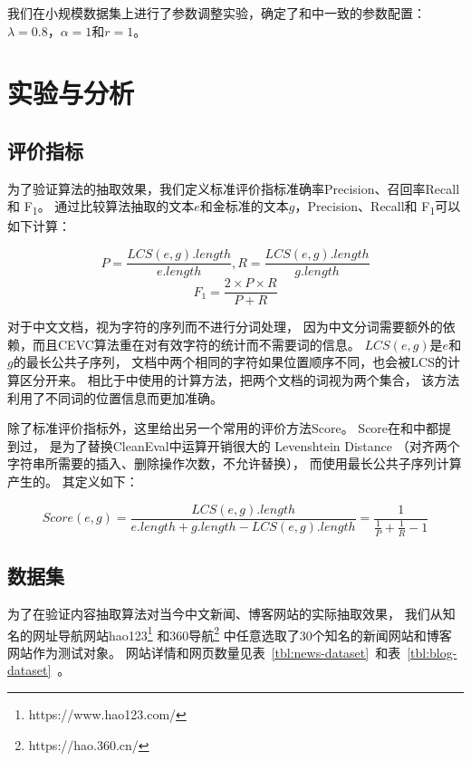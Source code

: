 我们在小规模数据集上进行了参数调整实验，确定了和\cite{wu2013web}中一致的参数配置：
$\lambda=0.8$，$\alpha=1$和$r=1$。

\section{实验与分析}
\label{sec:cevc-experiment}

\subsection{评价指标}
为了验证算法的抽取效果，我们定义标准评价指标准确率Precision、召回率Recall和
F\textsubscript{1}。
通过比较算法抽取的文本$e$和金标准的文本$g$，Precision、Recall和
F\textsubscript{1}可以如下计算：

\begin{equation}
P = \frac{LCS(e,g).length}{e.length}, R = \frac{LCS(e,g).length}{g.length}
\end{equation}
\begin{equation}
F_1 = \frac{2 \times P \times R}{P + R}
\end{equation}

对于中文文档，视为字符的序列而不进行分词处理，
因为中文分词需要额外的依赖，而且CEVC算法重在对有效字符的统计而不需要词的信息。
$LCS(e,g)$是$e$和$g$的最长公共子序列，
文档中两个相同的字符如果位置顺序不同，也会被LCS的计算区分开来。
相比于\cite{weninger2010cetr}中使用的计算方法，把两个文档的词视为两个集合，
该方法利用了不同词的位置信息而更加准确。

除了标准评价指标外，这里给出另一个常用的评价方法Score。
Score在\cite{sun2011dom}和\cite{wu2013web}中都提到过，
是为了替换CleanEval中运算开销很大的
Levenshtein Distance
（对齐两个字符串所需要的插入、删除操作次数，不允许替换），
而使用最长公共子序列计算产生的。
其定义如下：

\begin{equation}
Score(e,g) = \frac{LCS(e,g).length}{e.length + g.length - LCS(e,g).length}
= \frac{1}{\frac{1}{P} + \frac{1}{R} - 1}
\end{equation}

\subsection{数据集}

为了在验证内容抽取算法对当今中文新闻、博客网站的实际抽取效果，
我们从知名的网址导航网站hao123\footnote{https://www.hao123.com/}
和360导航\footnote{https://hao.360.cn/}
中任意选取了30个知名的新闻网站和博客网站作为测试对象。
网站详情和网页数量见表~\ref{tbl:news-dataset}~和表~\ref{tbl:blog-dataset}~。

